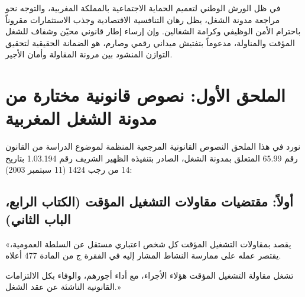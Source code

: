 \vspace{0.5cm}

\begin{tcolorbox}[colback=maincolor!5, colframe=maincolor, arc=5pt,
    title={\textbf{أفق مستقبلي: نحو تعاقد اجتماعي منصف}}]
في ظل الورش الوطني لتعميم الحماية الاجتماعية بالمملكة المغربية، والتوجه نحو مراجعة مدونة الشغل، يظل رهان التنافسية الاقتصادية وجذب الاستثمارات مقروناً باحترام الأمن الوظيفي وكرامة الشغالين. وإن إرساء إطار قانوني محيّن وشفاف للشغل المؤقت والمناولة، مدعوماً بتفتيش ميداني رقمي وصارم، هو الضمانة الحقيقية لتحقيق التوازن المنشود بين مرونة المقاولة وأمان الأجير.
\end{tcolorbox}

\appendix

\chapter*{الملحق الأول: نصوص قانونية مختارة من مدونة الشغل المغربية}

نورد في هذا الملحق النصوص القانونية المرجعية المنظمة لموضوع الدراسة من القانون رقم \textenglish{65.99} المتعلق بمدونة الشغل، الصادر بتنفيذه الظهير الشريف رقم \textenglish{1.03.194} بتاريخ \textenglish{14} من رجب \textenglish{1424} (\textenglish{11} سبتمبر \textenglish{2003}):

\section*{أولاً: مقتضيات مقاولات التشغيل المؤقت (الكتاب الرابع، الباب الثاني)}

\begin{tcolorbox}[colback=lightgray, colframe=sectioncolor, arc=3pt, title={\textbf{المادة 495}}]
«يقصد بمقاولات التشغيل المؤقت كل شخص اعتباري مستقل عن السلطة العمومية، يقتصر عمله على ممارسة النشاط المشار إليه في الفقرة ج من المادة \textenglish{477} أعلاه.

تشغل مقاولة التشغيل المؤقت هؤلاء الأجراء، مع أداء أجورهم، والوفاء بكل الالتزامات القانونية الناشئة عن عقد الشغل.»
\end{tcolorbox}

